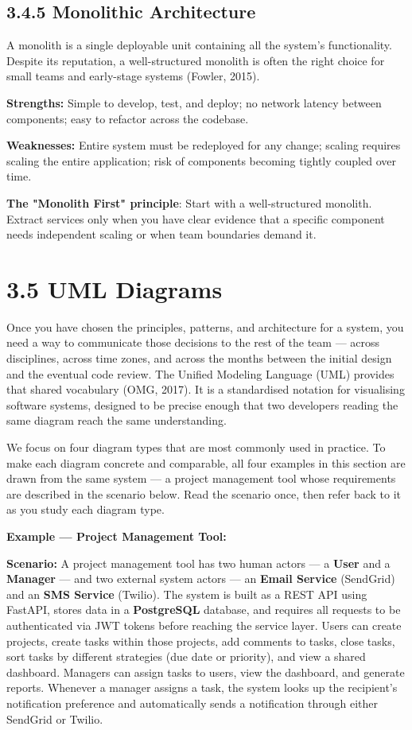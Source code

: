 \documentclass[11pt,a4paper]{book}
\begin{document}
\subsection{3.4.5 Monolithic Architecture}

A monolith is a single deployable unit containing all the system's functionality. Despite its reputation, a well-structured monolith is often the right choice for small teams and early-stage systems (Fowler, 2015).

\textbf{Strengths:} Simple to develop, test, and deploy; no network latency between components; easy to refactor across the codebase.

\textbf{Weaknesses:} Entire system must be redeployed for any change; scaling requires scaling the entire application; risk of components becoming tightly coupled over time.

\textbf{The "Monolith First" principle}: Start with a well-structured monolith. Extract services only when you have clear evidence that a specific component needs independent scaling or when team boundaries demand it.

\medskip

\section{3.5 UML Diagrams}

Once you have chosen the principles, patterns, and architecture for a system, you need a way to communicate those decisions to the rest of the team --- across disciplines, across time zones, and across the months between the initial design and the eventual code review. The Unified Modeling Language (UML) provides that shared vocabulary (OMG, 2017). It is a standardised notation for visualising software systems, designed to be precise enough that two developers reading the same diagram reach the same understanding.

We focus on four diagram types that are most commonly used in practice. To make each diagram concrete and comparable, all four examples in this section are drawn from the same system --- a project management tool whose requirements are described in the scenario below. Read the scenario once, then refer back to it as you study each diagram type.

\textbf{Example --- Project Management Tool:}

\textbf{Scenario:} A project management tool has two human actors --- a \textbf{User} and a \textbf{Manager} --- and two external system actors --- an \textbf{Email Service} (SendGrid) and an \textbf{SMS Service} (Twilio). The system is built as a REST API using FastAPI, stores data in a \textbf{PostgreSQL} database, and requires all requests to be authenticated via JWT tokens before reaching the service layer. Users can create projects, create tasks within those projects, add comments to tasks, close tasks, sort tasks by different strategies (due date or priority), and view a shared dashboard. Managers can assign tasks to users, view the dashboard, and generate reports. Whenever a manager assigns a task, the system looks up the recipient's notification preference and automatically sends a notification through either SendGrid or Twilio.
\end{document}
